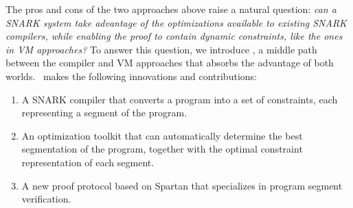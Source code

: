 The pros and cons of the two approaches above raise a natural question: \emph{can a SNARK system take advantage of the optimizations available to existing SNARK compilers, while enabling the proof to contain dynamic constraints, like the ones in VM approaches?} To answer this question, we introduce \CoBBl, a middle path between the compiler and VM approaches that absorbs the advantage of both worlds. \CoBBl~makes the following innovations and contributions:
\begin{enumerate}
    \item A SNARK compiler that converts a program into a set of constraints, each representing a segment of the program.
    \item An optimization toolkit that can automatically determine the best segmentation of the program, together with the optimal constraint representation of each segment.
    \item A new proof protocol based on Spartan \cite{setty19spartan} that specializes in program segment verification.
\end{enumerate}